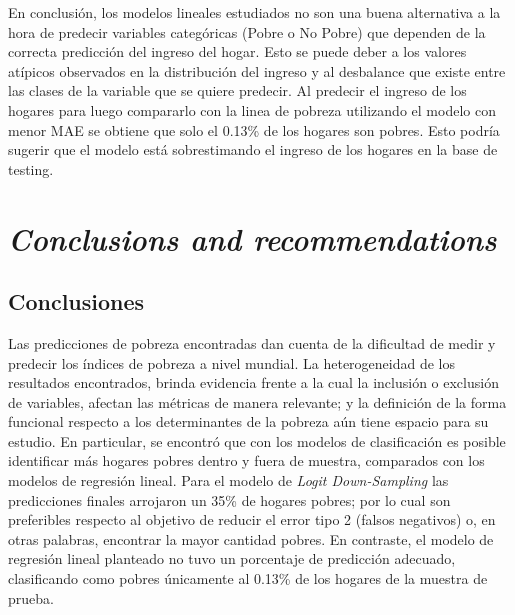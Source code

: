 \documentclass[11pt]{article}
\begin{document}
\justify
En conclusión, los modelos lineales estudiados no son una buena alternativa a la hora de predecir variables categóricas (Pobre o No Pobre) que dependen de la correcta predicción del ingreso del hogar. Esto se puede deber a los valores atípicos observados en la distribución del ingreso y al desbalance que existe entre las clases de la variable que se quiere predecir. Al predecir el ingreso de los hogares para luego compararlo con la linea de pobreza utilizando el modelo con menor MAE se obtiene que solo el 0.13\% de los hogares son pobres. Esto podría sugerir que el modelo está sobrestimando el ingreso de los hogares en la base de testing.

\section{\bf\emph {Conclusions and recommendations}}
\subsection{Conclusiones}
  \justify
Las predicciones de pobreza encontradas dan cuenta de la dificultad de medir y predecir los índices de pobreza a nivel mundial. La heterogeneidad de los resultados encontrados, brinda evidencia frente a la cual la inclusión o exclusión de variables, afectan las métricas de manera relevante; y la definición de la forma funcional respecto a los determinantes de la pobreza aún tiene espacio para su estudio. En particular, se encontró que con los modelos de clasificación es posible identificar más hogares pobres dentro y fuera de muestra, comparados con los modelos de regresión lineal. Para el modelo de \emph {Logit Down-Sampling} las predicciones finales arrojaron un 35\% de hogares pobres; por lo cual son preferibles respecto al objetivo de reducir el error tipo 2 (falsos negativos) o, en otras palabras, encontrar la mayor cantidad pobres. En contraste, el modelo de regresión lineal planteado no tuvo un porcentaje de predicción adecuado, clasificando como pobres únicamente al 0.13\% de los hogares de la muestra de prueba. 
\end{document}

